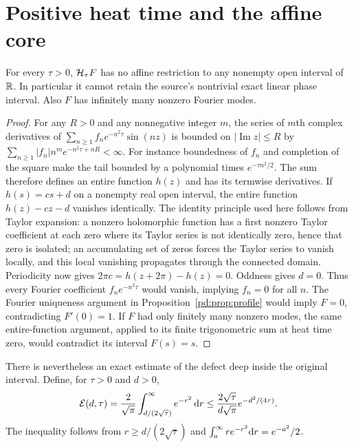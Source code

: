 \section{Positive heat time and the affine core}

\begin{pdproposition}\label{pd:prop:analytic}
For every $\tau>0$, $\mathcal H_\tau F$ has no affine restriction to any nonempty
open interval of $\mathbb R$. In particular it cannot retain the source's
nontrivial exact linear phase interval. Also $F$ has infinitely many
nonzero Fourier modes.
\end{pdproposition}
\begin{proof}
For any $R>0$ and any nonnegative integer $m$, the series of $m$th complex
derivatives of
$\sum_{n\geq1}f_ne^{-n^2\tau}\sin(nz)$ is bounded on
$|\operatorname{Im}z|\leq R$ by
$\sum_{n\geq1}|f_n|n^me^{-n^2\tau+nR}<\infty$.
For instance boundedness of $f_n$ and completion of the square make the
tail bounded by a polynomial times $e^{-\tau n^2/2}$.
The sum therefore defines an entire function $h(z)$ and has its
termwise derivatives. If $h(s)=cs+d$ on a nonempty real open interval,
the entire function $h(z)-cz-d$ vanishes identically. The identity
principle used here follows from Taylor expansion: a nonzero holomorphic
function has a first nonzero Taylor coefficient at each zero where its
Taylor series is not identically zero, hence that zero is isolated;
an accumulating set of zeros forces the Taylor series to vanish locally,
and this local vanishing propagates through the connected domain.
Periodicity now gives $2\pi c=h(z+2\pi)-h(z)=0$. Oddness gives $d=0$.
Thus every Fourier coefficient $f_ne^{-n^2\tau}$ would vanish, implying
$f_n=0$ for all $n$. The Fourier uniqueness argument in
Proposition~\ref{pd:prop:profile} would imply $F=0$, contradicting $F'(0)=1$.
If $F$ had only finitely many nonzero modes, the same entire-function
argument, applied to its finite trigonometric sum at heat time zero,
would contradict its interval $F(s)=s$.
\end{proof}

There is nevertheless an exact estimate of the defect deep inside the
original interval. Define, for $\tau>0$ and $d>0$,
\begin{equation}\label{pd:eq:tail}
 \mathcal E(d,\tau)=\frac{2}{\sqrt\pi}
          \int_{d/(2\sqrt\tau)}^\infty e^{-r^2}\,\mathrm d r
 \leq\frac{2\sqrt\tau}{d\sqrt\pi}e^{-d^2/(4\tau)}.
\end{equation}
The inequality follows from $r\geq d/(2\sqrt\tau)$ and
$\int_a^\infty r e^{-r^2}\mathrm d r=e^{-a^2}/2$.

